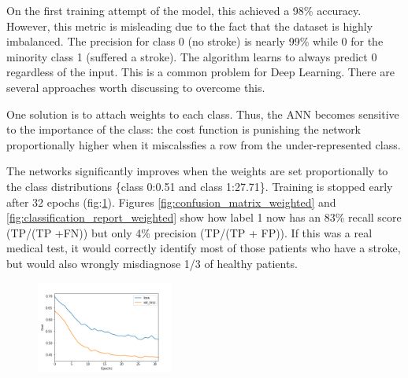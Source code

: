 \documentclass[proposal]{softeng}
\begin{document}
On the first training attempt of the model, this achieved a 98\% accuracy. However, this metric is misleading due to the fact that the dataset is highly imbalanced. The precision for class 0 (no stroke) is nearly 99\% while 0 for the minority class 1 (suffered a stroke). The algorithm learns to always predict 0 regardless of the input. This is a common problem for Deep Learning. There are several approaches worth discussing to overcome this.

One solution is to attach weights to each class\cite{cost_sensitive}\cite{WangS}. Thus, the ANN becomes sensitive to the importance of the class: the cost function is punishing the network proportionally higher when it miscalssfies a row from the under-represented class.

The networks significantly improves when the weights are set proportionally to the class distributions \{class 0:0.51 and class 1:27.71\}. Training is stopped early after 32 epochs (fig:\ref{fig:val_loss_weighted}).  Figures  \ref{fig:confusion_matrix_weighted} and \ref{fig:classification_report_weighted} show how label 1 now has an 83\% recall score (TP/(TP +FN)) but only 4\% precision (TP/(TP + FP)). If this was a real medical test, it would correctly identify most of those patients who have a stroke, but would also wrongly misdiagnose 1/3 of healthy patients.

\begin{figure}[h!]
\centering
 \includegraphics[width=0.4\textwidth]{images/building_ann/val_loss_weighted.png}
  \label{fig:val_loss_weighted}
\end{figure}
\end{document}
